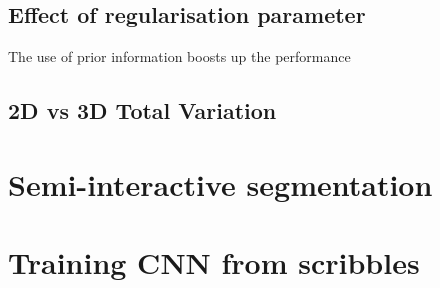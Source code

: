 \section{Effect of regularisation parameter}
The use of prior information boosts up the performance

\section{2D vs 3D Total Variation}

\chapter{Semi-interactive segmentation}
\chapter{Training CNN from scribbles}

